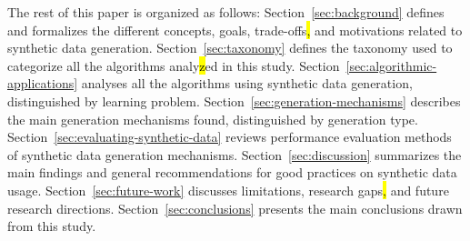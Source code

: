The rest of this paper is organized as follows: Section~\ref{sec:background}
defines and formalizes the different concepts, goals, trade-offs\hl{,} and
motivations related to synthetic data generation. Section~\ref{sec:taxonomy}
defines the taxonomy used to categorize all the algorithms analy\hl{z}ed in this
study. Section~\ref{sec:algorithmic-applications} analyses all the algorithms
using synthetic data generation, distinguished by learning problem.
Section~\ref{sec:generation-mechanisms} describes the main generation
mechanisms found, distinguished by generation type.
Section~\ref{sec:evaluating-synthetic-data} reviews performance evaluation
methods of synthetic data generation mechanisms. Section~\ref{sec:discussion}
summarizes the main findings and general recommendations for good practices on
synthetic data usage. Section~\ref{sec:future-work} discusses limitations,
research gaps\hl{,} and future research directions. Section~\ref{sec:conclusions}
presents the main conclusions drawn from this study.
